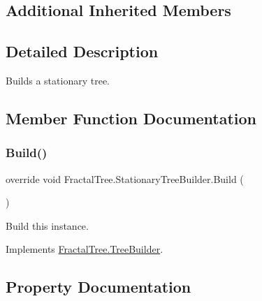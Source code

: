 \subsection*{Additional Inherited Members}


\subsection{Detailed Description}
Builds a stationary tree. 



\subsection{Member Function Documentation}
\hypertarget{class_fractal_tree_1_1_stationary_tree_builder_ab11cfafdc3a0e6c29fe4eef3318331b7}{}\label{class_fractal_tree_1_1_stationary_tree_builder_ab11cfafdc3a0e6c29fe4eef3318331b7} 
\subsubsection{\texorpdfstring{Build()}{Build()}}
{\footnotesize\ttfamily override void Fractal\+Tree.\+Stationary\+Tree\+Builder.\+Build (\begin{DoxyParamCaption}{ }\end{DoxyParamCaption})\hspace{0.3cm}{\ttfamily [virtual]}}



Build this instance. 



Implements \hyperlink{class_fractal_tree_1_1_tree_builder}{Fractal\+Tree.\+Tree\+Builder}.



\subsection{Property Documentation}
\hypertarget{class_fractal_tree_1_1_stationary_tree_builder_a103e903dbfba82226ab6cbb08fff382a}{}\label{class_fractal_tree_1_1_stationary_tree_builder_a103e903dbfba82226ab6cbb08fff382a} 
